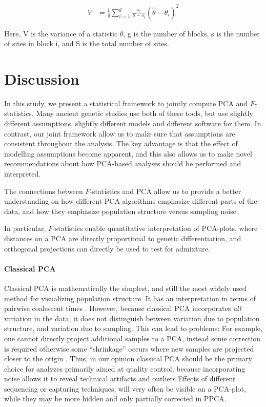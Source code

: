\documentclass[12pt, letterpaper]{article}
\begin{document}
\begin{align}\label{eq:bjk_var}
V &= \frac{1}{g} \sum_{i=1}^g \frac{s_i}{S-s_i} (\hat{\theta} - \theta_i)^2
\end{align}

Here, V is the variance of a statistic $\theta$, g is the number of blocks, s is the number of sites in block i, and S is the total number of sites.


\section{Discussion}
In this study, we present a statistical framework to jointly compute PCA and $F$-statistics. Many ancient genetic studies use both of these tools, but use slightly different assumptions, slightly different models and different software for them. In contrast, our joint framework allow us to make sure that assumptions are consistent throughout the analysis. The key advantage is that the effect of modelling assumptions become apparent, and this also allows us to make novel recommendations about how PCA-based analyses should be performed and interpreted.

The connections between $F$-statistics and PCA allow us to provide a better understanding on how different PCA algorithms emphasize different parts of the data, and how they emphasize population structure versus sampling noise.

In particular, $F$-statistics enable quantitative interpretation of PCA-plots, where distances on a PCA are directly proportional to genetic differentiation, and orthogonal projections can directly be used to test for admixture. 


\paragraph{Classical PCA}
Classical PCA is mathematically the simplest, and still the most widely used method for visualizing population structure. It has an interpretation in terms of pairwise coalescent times \citep{mcvean_genealogical_2009}. However, because classical PCA incorporates \emph{all} variation in the data, it does not distinguish between variation due to population structure, and variation due to sampling. This can lead to problems: For example, one cannot directly project additional samples to a PCA, instead some correction is required  otherwise some ``shrinkage'' occurs where new samples are projected closer to the origin \citep{patterson_population_2006}.  Thus,  in our opinion classical PCA should be the primary choice for analyzes primarily aimed at quality control, because incorporating noise allows it to reveal technical artifacts and outliers Effects of different sequencing or capturing techniques, will very often be visible on a PCA-plot, while they may be more hidden and only partially corrected in PPCA.
\end{document}
